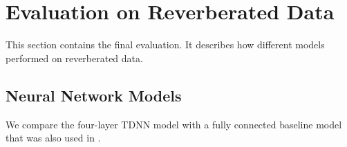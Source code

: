 
\chapter{Evaluation on Reverberated Data}
\label{ch:results}
This section contains the final evaluation. It describes how different models performed on reverberated data.
\section{Neural Network Models}
We compare the four-layer TDNN model with a fully connected baseline model that was also used in \cite{nguyen20162016}. 
